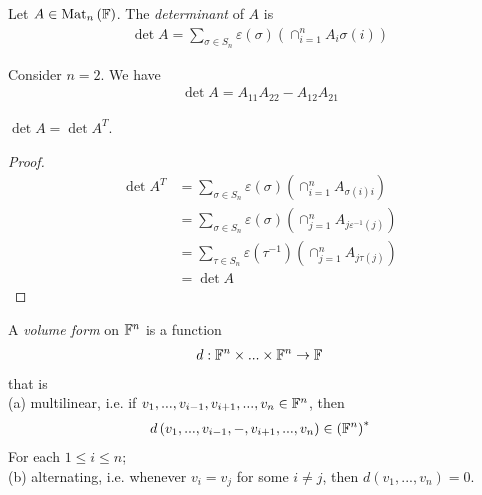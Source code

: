 \documentclass[a4paper]{article}
\begin{document}
\begin{defi}
Let $A \in \operatorname{Mat}_n\left(\mathbb{F}\right)$. The \emph{determinant} of $A$ is
\begin{equation*}
\begin{aligned}
\det A = \sum_{\sigma \in S_n} \varepsilon\left(\sigma\right) \left(\cap_{i=1}^n A_i \sigma\left(i\right)\right)
\end{aligned}
\end{equation*}
\end{defi}

\begin{eg}
Consider $n=2$. We have
\begin{equation*}
\begin{aligned}
\det A = A_{11} A_{22} - A_{12} A_{21}
\end{aligned}
\end{equation*}
\end{eg}

\begin{lemma}
$\det A = \det A^T$.
\begin{proof}
\begin{equation*}
\begin{aligned}
\det A^T &= \sum_{\sigma \in S_n} \varepsilon\left(\sigma\right)\left( \cap_{i=1}^n A_{\sigma\left(i\right) i}\right)\\
&= \sum_{\sigma \in S_n} \varepsilon\left(\sigma\right) \left(\cap_{j=1}^n A_{j \varepsilon^{-1}\left(j\right)}\right)\\
&= \sum_{\tau\in S_n} \varepsilon\left(\tau^{-1}\right) \left(\cap_{j=1}^n A_{j \tau\left(j\right)}\right)\\
&= \det A
\end{aligned}
\end{equation*}
\end{proof}
\end{lemma}

\begin{defi}
A \emph{volume form} on $\mathbb{F}^n$ is a function
\begin{equation*}
\begin{aligned}
d: \mathbb{F}^n \times ... \times \mathbb{F}^n \to \mathbb{F}
\end{aligned}
\end{equation*}
that is\\
(a) multilinear, i.e. if $v_1,...,v_{i-1},v_{i+1},...,v_n \in \mathbb{F}^n$, then
\begin{equation*}
\begin{aligned}
d\left(v_1,...,v_{i-1},-,v_{i+1},...,v_n\right) \in \left(\mathbb{F}^n\right)^*
\end{aligned}
\end{equation*}
For each $1\leq i \leq n$;\\
(b) alternating, i.e. whenever $v_i = v_j$ for some $i \neq j$, then $d\left(v_1,...,v_n\right) = 0$.
\end{defi}
\end{document}
